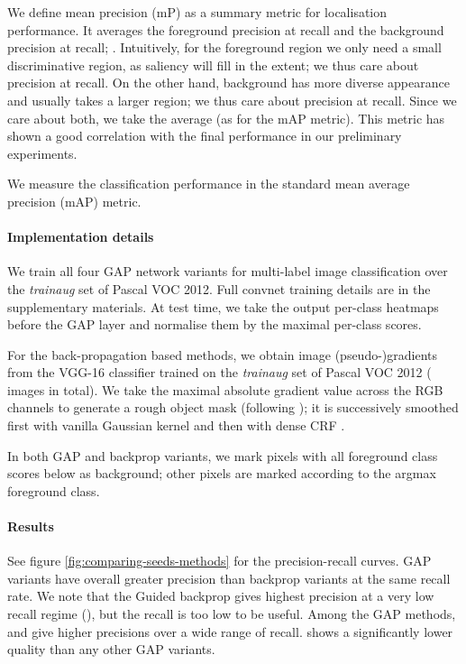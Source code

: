 \documentclass[british,10pt,twocolumn,letterpaper]{article}
\begin{document}
 We define mean precision (mP) as a summary metric for localisation
 performance. It averages the foreground precision at  recall
 and the background precision at  recall; .
 Intuitively, for the foreground region we only need a small discriminative
 region, as saliency will fill in the extent; we thus care about precision
 at  recall. On the other hand, background
 has more diverse appearance and usually takes a larger region; we
 thus care about precision at  recall. Since
 we care about both, we take the average (as for the mAP metric). This
 metric has shown a good correlation with the final performance in
 our preliminary experiments.
 
 We measure the classification performance in the standard mean average
 precision (mAP) metric. 
 
 \paragraph{Implementation details}
 
 We train all four GAP network variants for multi-label image classification
 over the \emph{trainaug} set of Pascal VOC 2012. Full convnet training
 details are in the supplementary materials. At test time, we take
 the output per-class heatmaps before the GAP layer and normalise them
 by the maximal per-class scores. 
 
 For the back-propagation based methods, we obtain image (pseudo-)gradients
 from the VGG-16 \cite{Simonyan2015Iclr} classifier trained on the
 \emph{trainaug} set of Pascal VOC 2012 ( images in total).
 We take the maximal absolute gradient value across the RGB channels
 to generate a rough object mask (following \cite{Simonyan2014Iclr});
 it is successively smoothed first with vanilla Gaussian kernel and
 then with dense CRF \cite{Kraehenbuehl2011Nips}. 
 
 In both GAP and backprop variants, we mark pixels with all foreground
 class scores below  as background; other pixels are marked
 according to the argmax foreground class.
 
 \paragraph{Results}
 
 See figure \ref{fig:comparing-seeds-methods} for the precision-recall
 curves. GAP variants have overall greater precision than backprop
 variants at the same recall rate. We note that the Guided backprop
 gives highest precision at a very low recall regime (),
 but the recall is too low to be useful. Among the GAP methods, 
 and  give higher precisions over
 a wide range of recall.  shows
 a significantly lower quality than any other GAP variants.
 
\end{document}
